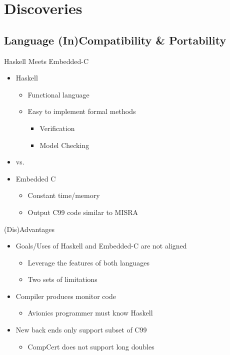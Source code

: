\documentclass[xcolor={dvipsnames}]{beamer}
\begin{document}
\section{Discoveries}
\subsection[(In)Compatibility]{Language (In)Compatibility \& Portability}
\begin{frame}{Haskell Meets Embedded-C}
  \begin{itemize}
  \item
    Haskell
    \begin{itemize}
    \item
      Functional language
    \item
      Easy to implement \alert{formal methods}
      \begin{itemize}
      \item
        Verification
      \item
        Model Checking
      \end{itemize}
  \end{itemize}
  \item[]
    vs.
  \item
    Embedded C
    \begin{itemize}
    \item
      \alert{Constant} time/memory
    \item
      Output C99 code similar to MISRA
    \end{itemize}
  \end{itemize}
\end{frame}
\begin{frame}{(Dis)Advantages}
  \begin{itemize}
  \item
    Goals/Uses of Haskell and Embedded-C are \alert{not aligned}
    \begin{itemize}
    \item
      Leverage the features of both languages
    \item
      Two sets of limitations
    \end{itemize}
  \item
    Compiler produces monitor code
    \begin{itemize}
    \item
      Avionics programmer \alert{must know Haskell}
    \end{itemize}
  \item
    New back ends only support subset of C99
    \begin{itemize}
    \item
      CompCert does not support long doubles
    \end{itemize}
  \end{itemize}
\end{frame}
\end{document}
